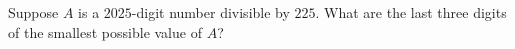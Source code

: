 Suppose $A$ is a $2025$-digit number divisible by $225$. What are the last three digits of the smallest possible value of $A$?
